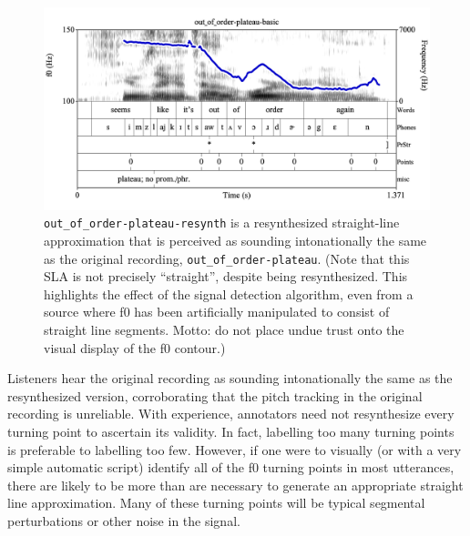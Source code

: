 \documentclass[11pt, twoside]{memoir}
\begin{document}
\begin{figure}[H]
\centering
\includegraphics[width=.875\linewidth]{Points-out_of_order-plateau-resynth-basic.png}
\caption[\texttt{out\_of\_order-plateau-resynth} is a resynthesized straight-line approximation that is perceived as sounding intonationally the same as the original recording, \texttt{out\_of\_order-plateau}.]{\texttt{out\_of\_order-plateau-resynth} is a resynthesized straight-line approximation that is perceived as sounding intonationally the same as the original recording, \texttt{out\_of\_order-plateau}. (Note that this SLA is not precisely “straight”, despite being resynthesized. This highlights the effect of the signal detection algorithm, even from a source where f0 has been artificially manipulated to consist of straight line segments. Motto: do not place undue trust onto the visual display of the f0 contour.)
\label{fig:out_of_order-plateau Points basic resynth}
}
\end{figure}
Listeners hear the original recording as sounding intonationally the same as the resynthesized version, corroborating that the pitch tracking in the original recording is unreliable.
With experience, annotators need not resynthesize every turning point to ascertain its validity. In fact, labelling too many turning points is preferable to labelling too few. However, if one were to visually (or with a very simple automatic script) identify all of the f0 turning points in most utterances, there are likely to be more than are necessary to generate an appropriate straight line approximation. Many of these turning points will be typical segmental perturbations or other noise in the signal.
\end{document}
